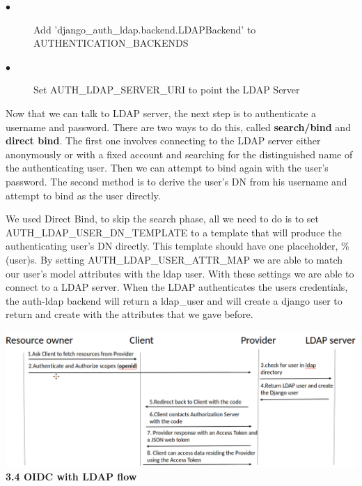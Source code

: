 \begin{description}
	\item[$\bullet$] Add 'django\_auth\_ldap.backend.LDAPBackend' to AUTHENTICATION\_BACKENDS
	\item[$\bullet$] Set AUTH\_LDAP\_SERVER\_URI to point the LDAP Server
\end{description}

Now that we can talk to LDAP server, the next step is to authenticate a username and password. There are two ways to do this, called \textbf{search/bind} and \textbf{direct bind}. The first one involves connecting to the LDAP server either anonymously or with a fixed account and searching for the distinguished name of the authenticating user. Then we can attempt to bind again with the user’s password. The second method is to derive the user’s DN from his username and attempt to bind as the user directly.

We used Direct Bind, to skip the search phase, all we need to do is to set AUTH\_LDAP\_USER\_DN\_TEMPLATE to a template that will produce the authenticating user’s DN directly. This template should have one placeholder, \%(user)s. By setting AUTH\_LDAP\_USER\_ATTR\_MAP we are able to match our user's model attributes with the ldap user. 
With these settings we are able to connect to a LDAP server. When the LDAP authenticates the users credentials, the auth-ldap backend will return a ldap\_user and will create a django user to return and create with the attributes that we gave before. 


\begin{center}
	\includegraphics[scale=0.4]{figures/LDAP.png}\\
	\textcolor{LDAP}{\textbf{3.4 OIDC with LDAP flow}}
\end{center}
 



























